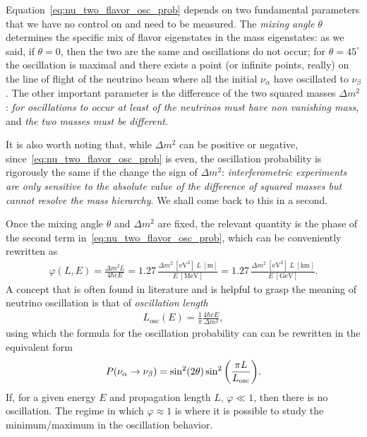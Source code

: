 Equation~\eqref{eq:nu_two_flavor_osc_prob} depends on two fundamental parameters
that we have no control on and need to be measured. The \emph{mixing angle} $\theta$
determines the specific mix of flavor eigenstates in the mass eigenstates: as we
said, if $\theta = 0$, then the two are the same and oscillations do not occur;
for $\theta = 45^\circ$ the oscillation is maximal and there exists a point (or
infinite points, really) on the line of flight of the neutrino beam where all the
initial $\nu_\alpha$ have oscillated to $\nu_\beta$. The other important parameter is
the difference of the two squared masses $\Delta m^2$: \emph{for oscillations
to occur at least of the neutrinos must have non vanishing mass}, and \emph{the two masses must be different}.

It is also worth noting that, while $\Delta m^2$ can be positive or negative,
since~\eqref{eq:nu_two_flavor_osc_prob} is even, the oscillation probability is
rigorously the same if the change the sign of $\Delta m^2$: \emph{interferometric
experiments are only sensitive to the absolute value of the difference of squared
masses but cannot resolve the mass hierarchy}. We shall come back to this in a
second.

\begin{marginfigure}
  
  \caption{Neutrino oscillation length as a function of energy for the two relevant
  values of $\Delta m^2$, $\Delta m^2_\odot$ and $\Delta m^2_\text{atm}$,
  that we shall see in sections~\ref{sec:nu_solar_solution} and~\ref{sec:nu_atmospheric}.}
  \label{fig:nu_oscillation_length}
\end{marginfigure}

Once the mixing angle $\theta$ and $\Delta m^2$ are fixed, the relevant quantity
is the phase of the second term in~\eqref{eq:nu_two_flavor_osc_prob}, which
can be conveniently rewritten as
\begin{align}
  \varphi(L, E) = \frac{\Delta m^2 L}{4 \hbar c E} =
  1.27\, \frac{\Delta m^2~[\text{eV}^2]~L~[\text{m}]}{E~[\text{MeV}]} =
  1.27\, \frac{\Delta m^2~[\text{eV}^2]~L~[\text{km}]}{E~[\text{GeV}]}.
\end{align}
A concept that is often found in literature and is helpful to grasp the meaning of
neutrino oscillation is that of \emph{oscillation length}
\begin{align*}
  L_\text{osc}(E) = \frac{1}{\pi} \frac{4\hbar c E}{\Delta m^2},
\end{align*}
using which the formula for the oscillation probability can can be rewritten in
the equivalent form
\begin{align*}
  P(\nu_\alpha \rightarrow \nu_\beta) =
  \sin^2(2\theta)\sin^2 \qty(\frac{\pi L}{L_\text{osc}}).
\end{align*}
If, for a given energy $E$ and propagation length $L$, $\varphi \ll 1$, then there
is no oscillation. The regime in which $\varphi \approx 1$ is where it is possible
to study the minimum/maximum in the oscillation behavior.

